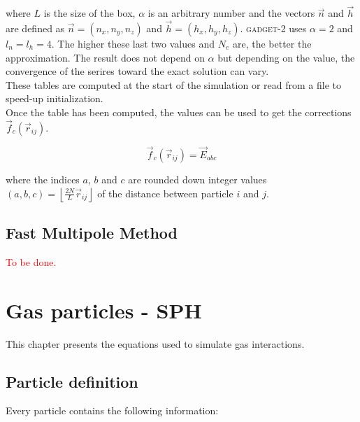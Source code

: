 \documentclass[a4paper,10pt]{report}
\newcommand{\gadget}{\textsc{gadget-2 }}
\begin{document}
where $L$ is the size of the box, $\alpha$ is an arbitrary number and the vectors $\vec{n}$ and $\vec{h}$ are defined
as $\vec{n} = (n_x,n_y,n_z)$ and $\vec{h} = (h_x,h_y,h_z)$. \gadget uses $\alpha=2$ and $l_n=l_h=4$. The higher these
last two values and $N_e$ are, the better the approximation. The result does not depend on $\alpha$ but depending on
the value, the convergence of the serires toward the exact solution can vary. \\
These tables are computed at the start of the simulation or read from a file to speed-up initialization. \\

Once the table has been computed, the values can be used to get the corrections $\vec{f}_c(\vec{r}_{ij})$.

\begin{equation}
 \vec{f}_c(\vec{r}_{ij}) = \vec{E}_{abc}
\end{equation}

where the indices $a$, $b$ and $c$ are rounded down integer values $(a,b,c) = \left\lfloor\frac{2N}{L}
\vec{r}_{ij}\right\rfloor$ of the distance between particle $i$ and $j$.

\section{Fast Multipole Method}


\textcolor{red}{To be done.}







\chapter{Gas particles - SPH}
\label{chap:SPH}

This chapter presents the equations used to simulate gas interactions.

\section{Particle definition}
Every particle contains the following information:
\end{document}
